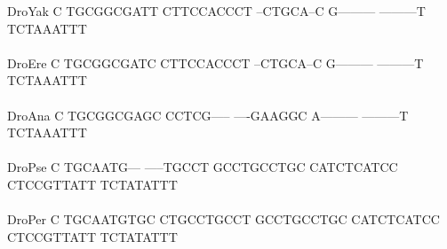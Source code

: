 \documentclass[11pt,twoside,reqno,a4paper]{article}
\begin{document}
{DroYak	C	TGCGGCGATT	CTTCCACCCT	--CTGCA--C	G---------	---------T	TCTAAATTT\\
\hspace*{7\charwidth}\hspace*{1\charwidth}\hspace*{1\charwidth}\hspace*{1\charwidth}\hspace*{1\charwidth}\hspace*{1\charwidth}\hspace*{1\charwidth}\\
DroEre	C	TGCGGCGATC	CTTCCACCCT	--CTGCA--C	G---------	---------T	TCTAAATTT\\
\hspace*{7\charwidth}\hspace*{1\charwidth}\hspace*{1\charwidth}\hspace*{1\charwidth}\hspace*{1\charwidth}\hspace*{1\charwidth}\hspace*{1\charwidth}\\
DroAna	C	TGCGGCGAGC	CCTCG-----	----GAAGGC	A---------	---------T	TCTAAATTT\\
\hspace*{7\charwidth}\hspace*{1\charwidth}\hspace*{1\charwidth}\hspace*{1\charwidth}\hspace*{1\charwidth}\hspace*{1\charwidth}\hspace*{1\charwidth}\\
DroPse	C	TGCAATG---	-----TGCCT	GCCTGCCTGC	CATCTCATCC	CTCCGTTATT	TCTATATTT\\
\hspace*{7\charwidth}\hspace*{1\charwidth}\hspace*{1\charwidth}\hspace*{1\charwidth}\hspace*{1\charwidth}\hspace*{1\charwidth}\hspace*{1\charwidth}\\
DroPer	C	TGCAATGTGC	CTGCCTGCCT	GCCTGCCTGC	CATCTCATCC	CTCCGTTATT	TCTATATTT\\
\hspace*{7\charwidth}\hspace*{1\charwidth}\hspace*{1\charwidth}\hspace*{1\charwidth}\hspace*{1\charwidth}\hspace*{1\charwidth}\hspace*{1\charwidth}\\
}
\end{document}
